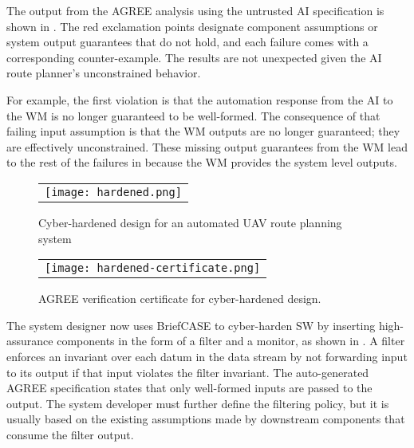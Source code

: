 The output from the AGREE analysis using the untrusted AI
specification is shown in .  The red
exclamation points designate component assumptions or system output
guarantees that do not hold, and each failure comes with a
corresponding counter-example.  The results are not unexpected given
the AI route planner's unconstrained behavior.

For example, the first violation is that the automation response from
the AI to the WM is no longer guaranteed to be well-formed.  The
consequence of that failing input assumption is that the WM outputs
are no longer guaranteed; they are effectively unconstrained.  These
missing output guarantees from the WM lead to the rest of the failures
in  because the WM provides the system
level outputs.

\begin{figure*}
  \begin{center}
    \begin{tabular}{c}
      \texttt{[image: hardened.png]}
    \end{tabular}
  \end{center}
  \caption{Cyber-hardened design for an automated UAV route planning system}
  \label{fig:hardened}
\end{figure*}

\begin{figure}
  \begin{center}
    \begin{tabular}{c}
      \texttt{[image: hardened-certificate.png]}
    \end{tabular}
  \end{center}
  \caption{AGREE verification certificate for cyber-hardened design.}
  \label{fig:hardened-certificate}
\end{figure}

The system designer now uses BriefCASE to cyber-harden SW by inserting
high-assurance components in the form of a filter and a monitor, as
shown in .  A filter enforces an invariant over
each datum in the data stream by not forwarding input to its output if
that input violates the filter invariant.  The auto-generated AGREE
specification states that only well-formed inputs are passed to the
output.  The system developer must further define the filtering
policy, but it is usually based on the existing assumptions made by
downstream components that consume the filter output.

